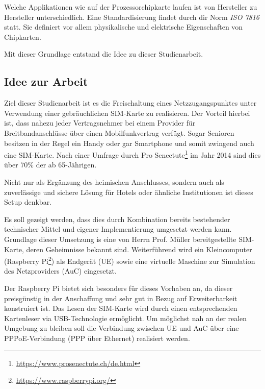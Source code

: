 Welche Applikationen wie auf der Prozessorchipkarte laufen ist von Hersteller zu Hersteller unterschiedlich.
Eine Standardisierung findet durch dir Norm \textit{ISO 7816} statt. Sie definiert vor allem physikalische
und elektrische Eigenschaften von Chipkarten.

Mit dieser Grundlage entstand die Idee zu dieser Studienarbeit.

\subsection{Idee zur Arbeit}
\label{idee-arbeit}
Ziel dieser Studienarbeit ist es die Freischaltung eines Netzzugangspunktes unter Verwendung einer 
gebräuchlichen \ac{SIM}-Karte zu realisieren. Der Vorteil hierbei ist, dass nahezu jeder
Vertragsnehmer bei einem Provider für Breitbandanschlüsse über einen Mobilfunkvertrag verfügt.
Sogar Senioren besitzen in der Regel ein Handy oder gar Smartphone und somit zwingend auch eine
\ac{SIM}-Karte. Nach einer Umfrage durch Pro Senectute\footnote{\url{https://www.prosenectute.ch/de.html}}
im Jahr 2014 sind dies über 70\% der ab 65-Jährigen.

Nicht nur als Ergänzung des heimischen Anschlusses, sondern auch als zuverlässige und sichere Lösung
für Hotels oder ähnliche Institutionen ist dieses Setup denkbar.

Es soll gezeigt werden, dass dies durch Kombination bereits bestehender technischer Mittel und
eigener Implementierung umgesetzt werden kann. Grundlage dieser Umsetzung is eine von Herrn Prof. Müller
bereitgestellte \ac{SIM}-Karte, deren Geheimnisse bekannt sind. Weiterführend wird ein Kleincomputer
(Raspberry Pi\footnote{\url{https://www.raspberrypi.org/}}) als Endgerät (\ac{UE}) sowie eine virtuelle
Maschine zur Simulation des Netzproviders (\ac{AuC}) eingesetzt. 

Der Raspberry Pi bietet sich besonders für dieses Vorhaben an, da dieser preisgünstig in der Anschaffung
und sehr gut in Bezug auf Erweiterbarkeit konstruiert ist. Das Lesen der \ac{SIM}-Karte
wird durch einen entsprechenden Kartenleser via USB-Technologie ermöglicht. Um möglichst nah
an der realen Umgebung zu bleiben soll die Verbindung zwischen \ac{UE} und \ac{AuC} über eine
\ac{PPPoE}-Verbindung (\ac{PPP} über Ethernet) realisiert werden.

\clearpage